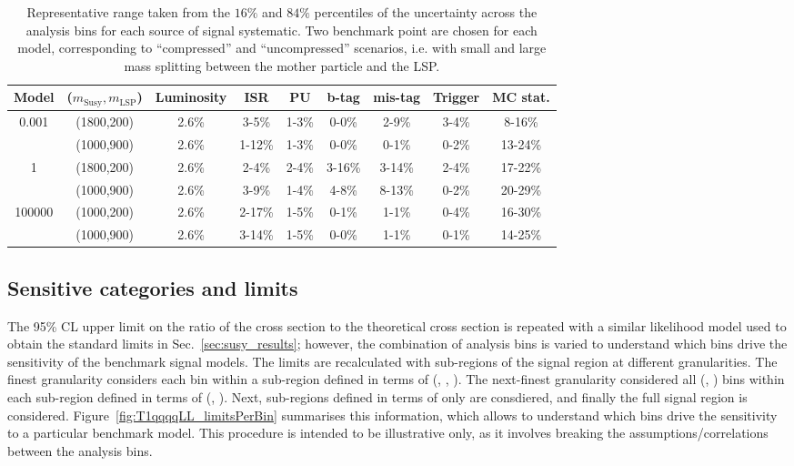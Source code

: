 \begin{table}[h!]
    \caption{
        Representative range taken from the $16\%$ and $84\%$ percentiles of the
        uncertainty across the analysis bins for each source of signal
        systematic. Two benchmark point are chosen for each model, corresponding
        to ``compressed'' and ``uncompressed'' scenarios, i.e. with small and
        large mass splitting between the mother particle and the LSP. 
    }
    \label{tab:sig-systematics-LLP}
    \centering
    \begin{tabular}{ ccccccccc }
        \hline \hline
        Model & ($m_{\mathrm{Susy}},m_{\mathrm{LSP}}$) & Luminosity & ISR & PU & b-tag & mis-tag & Trigger & MC stat. \\ \hline
        \multirow{2}{*}{0.001}
            & (1800,200) & 2.6\% & 3-5\% & 1-3\% & 0-0\% & 2-9\% & 3-4\% & 8-16\% \\
            & (1000,900) & 2.6\% & 1-12\% & 1-3\% & 0-0\% & 0-1\% & 0-2\% & 13-24\% \\
        \hline
        \multirow{2}{*}{1}
            & (1800,200) & 2.6\% & 2-4\% & 2-4\% & 3-16\% & 3-14\% & 2-4\% & 17-22\% \\
            & (1000,900) & 2.6\% & 3-9\% & 1-4\% & 4-8\% & 8-13\% & 0-2\% & 20-29\% \\        
        \hline
        \multirow{2}{*}{100000}
            & (1000,200) & 2.6\% & 2-17\% & 1-5\% & 0-1\% & 1-1\% & 0-4\% & 16-30\% \\
            & (1000,900) & 2.6\% & 3-14\% & 1-5\% & 0-0\% & 1-1\% & 0-1\% & 14-25\% \\
        \hline

        \hline \hline
    \end{tabular}
\end{table}

\clearpage
\subsection{Sensitive categories and limits}
\label{sec:LLP_results}

The 95\% CL upper limit on the ratio of the cross section to the
theoretical cross section is repeated with a similar likelihood model
used to obtain the standard limits in Sec.~\ref{sec:susy_results};
however, the combination of analysis bins is varied to understand
which bins drive the sensitivity of the benchmark signal models. The
limits are recalculated with sub-regions of the signal region at
different granularities. The finest granularity considers each \mht
bin within a sub-region defined in terms of (\njet, \nb, \scalht). The
next-finest granularity considered all (\scalht, \mht) bins within
each sub-region defined in terms of (\njet, \nb). Next, sub-regions
defined in terms of only \njet are consdiered, and finally the full
signal region is considered. Figure~\ref{fig:T1qqqqLL_limitsPerBin}
summarises this information, which allows to understand which bins
drive the sensitivity to a particular benchmark model. This procedure
is intended to be illustrative only, as it involves breaking the
assumptions/correlations between the analysis bins.

